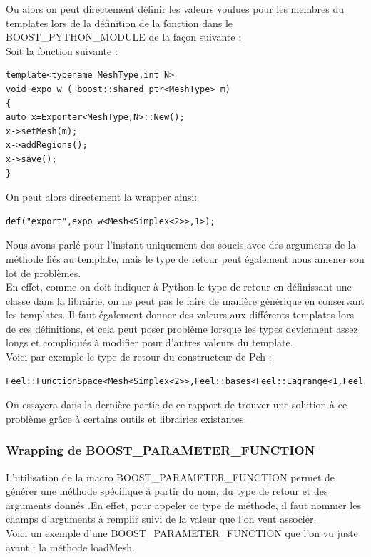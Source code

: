 \documentclass[french,12pt]{article}
\begin{document}
Ou alors on peut directement définir les valeurs voulues pour les membres du templates lors de la définition de la fonction dans le BOOST\_PYTHON\_MODULE de la façon suivante :\\
Soit la fonction suivante :
\begin{lstlisting}
template<typename MeshType,int N>
void expo_w ( boost::shared_ptr<MeshType> m)
{
auto x=Exporter<MeshType,N>::New();
x->setMesh(m);
x->addRegions();
x->save();
}
\end{lstlisting}

On peut alors directement la wrapper ainsi:
\begin{lstlisting}
def("export",expo_w<Mesh<Simplex<2>>,1>);
\end{lstlisting}

Nous avons parlé pour l'instant uniquement des soucis avec des arguments de la méthode liés au template, mais le type de retour peut également nous amener son lot de problèmes.\\

En effet, comme on doit indiquer à Python le type de retour en définissant une classe dans la librairie, on ne peut pas le faire de manière générique en conservant les templates. Il faut également donner des valeurs aux différents templates lors de ces définitions, et cela peut poser problème lorsque les types deviennent assez longs et compliqués à modifier pour d'autres valeurs du template.\\
Voici par exemple le type de retour du constructeur de Pch :
\begin{lstlisting}
Feel::FunctionSpace<Mesh<Simplex<2>>,Feel::bases<Feel::Lagrange<1,Feel::Scalar,Feel::Continuous,Feel::PointSetEquiSpaced,0>>,double,Feel::Periodicity<Feel::NoPeriodicity>,Feel::mortars<Feel::NoMortar>>
\end{lstlisting}

On essayera dans la dernière partie de ce rapport de trouver une solution à ce problème grâce à certains outils et librairies existantes.

\subsubsection{Wrapping de BOOST\_PARAMETER\_FUNCTION}

L'utilisation de la macro BOOST\_PARAMETER\_FUNCTION permet de générer une méthode spécifique à partir du nom, du type de retour et des arguments donnés .En effet, pour appeler ce type de méthode, il faut nommer les champs d'arguments à remplir suivi de la valeur que l'on veut associer.\\
Voici un exemple d'une BOOST\_PARAMETER\_FUNCTION que l'on vu juste avant : la méthode loadMesh.
\end{document}
